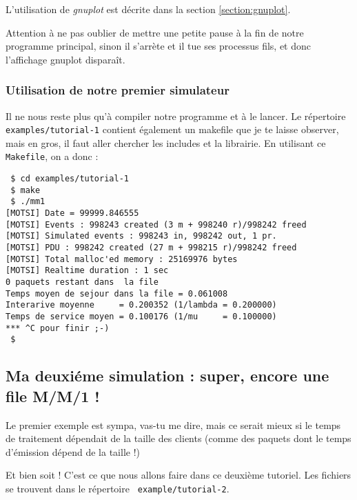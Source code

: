 \documentclass{article}
\begin{document}
   L'utilisation de {\em gnuplot} est décrite dans la section
\ref{section:gnuplot}.

   Attention à ne pas oublier de mettre une petite pause à la fin de
notre programme principal, sinon il s'arrète et il tue ses processus
fils, et donc l'affichage {\rm gnuplot} disparaît.

%
\subsubsection{Utilisation de notre premier simulateur}

   Il ne nous reste plus qu'à compiler notre programme et à le
lancer. Le répertoire {\tt examples/tutorial-1} contient également un
makefile que je te laisse observer, mais en gros, il faut aller
chercher les includes et la librairie. En utilisant ce {\tt Makefile},
on a donc :

\begin{verbatim}
 $ cd examples/tutorial-1
 $ make
 $ ./mm1
[MOTSI] Date = 99999.846555
[MOTSI] Events : 998243 created (3 m + 998240 r)/998242 freed
[MOTSI] Simulated events : 998243 in, 998242 out, 1 pr.
[MOTSI] PDU : 998242 created (27 m + 998215 r)/998242 freed
[MOTSI] Total malloc'ed memory : 25169976 bytes
[MOTSI] Realtime duration : 1 sec
0 paquets restant dans  la file
Temps moyen de sejour dans la file = 0.061008
Interarive moyenne     = 0.200352 (1/lambda = 0.200000)
Temps de service moyen = 0.100176 (1/mu     = 0.100000)
*** ^C pour finir ;-)
 $
\end{verbatim}

%
\subsection{Ma deuxiéme simulation : super, encore une file M/M/1 !}

   Le premier exemple est sympa, vas-tu me dire, mais ce serait mieux
si le temps de traitement dépendait de la taille des clients (comme
des paquets dont le temps d'émission dépend de la taille !)

   Et bien soit ! C'est ce que nous allons faire dans ce deuxième
tutoriel. Les fichiers se trouvent dans le répertoire {\tt
example/tutorial-2}.
\end{document}
